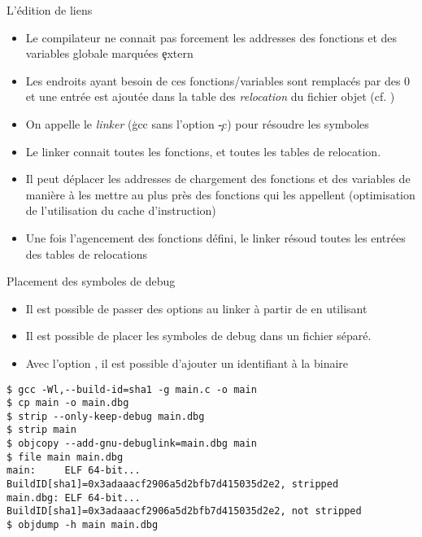 \begin{frame}[fragile=singleslide]{L'édition de liens}
  \begin{itemize}
  \item  Le compilateur  ne connait  pas forcement  les  addresses des
    fonctions et des variables globale marquées \c{extern}
  \item  Les endroits  ayant  besoin de  ces fonctions/variables  sont
    remplacés par  des 0 et une  entrée est ajoutée dans  la table des
    \emph{relocation} du fichier objet (cf. )
  \item  On appelle  le \emph{linker}  (\c{gcc} sans  l'option \c{-c})
    pour résoudre les symboles
  \item Le linker  connait toutes les fonctions, et  toutes les tables
    de relocation.
  \item Il peut déplacer les  addresses de chargement des fonctions et
    des variables de  manière à les mettre au  plus près des fonctions
    qui  les   appellent  (optimisation  de   l'utilisation  du  cache
    d'instruction)
  \item Une  fois l'agencement des fonctions défini,  le linker résoud
    toutes les entrées des tables de relocations
  \end{itemize}
\end{frame}

\begin{frame}[fragile=singleslide]{Placement des symboles de debug}
  \begin{itemize}
  \item Il  est possible de passer  des options au linker  à partir de
     en utilisant 
  \item  Il est  possible  de placer  les  symboles de  debug dans  un
    fichier séparé.
  \item Avec l'option , il est possible d'ajouter
    un identifiant à la binaire
  \end{itemize}
  \begin{lstlisting}
$ gcc -Wl,--build-id=sha1 -g main.c -o main
$ cp main -o main.dbg
$ strip --only-keep-debug main.dbg
$ strip main
$ objcopy --add-gnu-debuglink=main.dbg main
$ file main main.dbg
main:     ELF 64-bit... BuildID[sha1]=0x3adaaacf2906a5d2bfb7d415035d2e2, stripped
main.dbg: ELF 64-bit... BuildID[sha1]=0x3adaaacf2906a5d2bfb7d415035d2e2, not stripped
$ objdump -h main main.dbg
  \end{lstlisting}
\end{frame}

